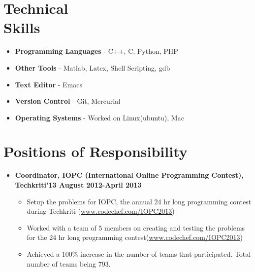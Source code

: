 \documentclass[margin,line]{resume}
\begin{document}
\begin{resume}
    \section{\mysidestyle Technical \\Skills} 

    \begin{itemize}
\item \textbf{\textsf{Programming Languages}} -  C++, C, Python, PHP
\item \textbf{\textsf{Other Tools}} - Matlab, Latex, Shell Scripting, gdb
\item \textbf{\textsf{Text Editor}} - Emacs
\item \textbf{\textsf{Version Control}} - Git, Mercurial
\item \textbf{\textsf{Operating Systems}} - Worked on Linux(ubuntu), Mac
\end{itemize}

    \section{\mysidestyle Positions of Responsibility} 

    \begin{itemize}

    \item  \textbf{\textsf{Coordinator, IOPC (International Online Programming Contest), Techkriti'13 August 2012-April 2013}}
      \begin{itemize}
      \item Setup the problems for IOPC, the annual 24 hr long programming contest during Techkriti (\url{www.codechef.com/IOPC2013})
      \item Worked with a team of 5 members on creating and testing the problems for the 24 hr long programming contest(\url{www.codechef.com/IOPC2013})

        \newpage

      \item Achieved a 100\% increase in the number of teams that participated. Total number of teams being 793. 
      \end{itemize}
      

\end{itemize}
\end{resume}
\end{document}
